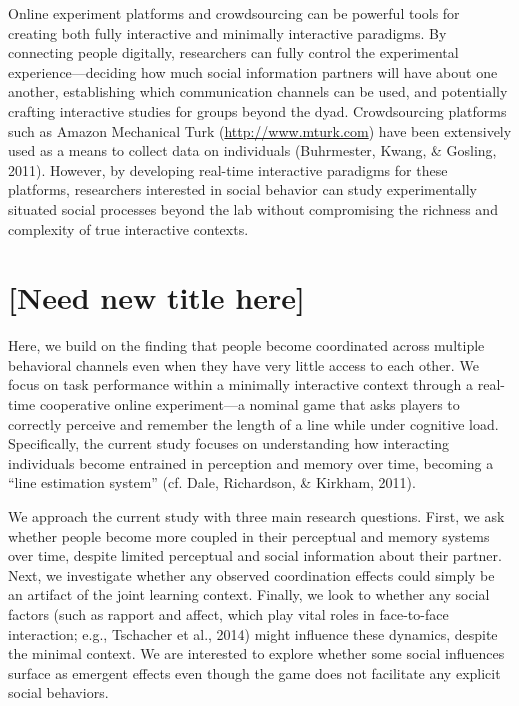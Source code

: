 \documentclass[10pt, letterpaper]{article}
\begin{document}
Online experiment platforms and crowdsourcing can be powerful tools for
creating both fully interactive and minimally interactive paradigms. By
connecting people digitally, researchers can fully control the
experimental experience---deciding how much social information partners
will have about one another, establishing which communication channels
can be used, and potentially crafting interactive studies for groups
beyond the dyad. Crowdsourcing platforms such as Amazon Mechanical Turk
(\url{http://www.mturk.com}) have been extensively used as a means to
collect data on individuals (Buhrmester, Kwang, \& Gosling, 2011).
However, by developing real-time interactive paradigms for these
platforms, researchers interested in social behavior can study
experimentally situated social processes beyond the lab without
compromising the richness and complexity of true interactive contexts.

\section{{[}Need new title here{]}}\label{need-new-title-here}

Here, we build on the finding that people become coordinated across
multiple behavioral channels even when they have very little access to
each other. We focus on task performance within a minimally interactive
context through a real-time cooperative online experiment---a nominal
game that asks players to correctly perceive and remember the length of
a line while under cognitive load. Specifically, the current study
focuses on understanding how interacting individuals become entrained in
perception and memory over time, becoming a ``line estimation system''
(cf. Dale, Richardson, \& Kirkham, 2011).

We approach the current study with three main research questions. First,
we ask whether people become more coupled in their perceptual and memory
systems over time, despite limited perceptual and social information
about their partner. Next, we investigate whether any observed
coordination effects could simply be an artifact of the joint learning
context. Finally, we look to whether any social factors (such as rapport
and affect, which play vital roles in face-to-face interaction; e.g.,
Tschacher et al., 2014) might influence these dynamics, despite the
minimal context. We are interested to explore whether some social
influences surface as emergent effects even though the game does not
facilitate any explicit social behaviors.
\end{document}
